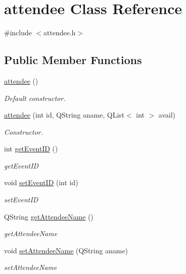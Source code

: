 \hypertarget{classattendee}{}\section{attendee Class Reference}
\label{classattendee}


{\ttfamily \#include $<$attendee.\+h$>$}

\subsection*{Public Member Functions}
\begin{DoxyCompactItemize}
\item 
\hyperlink{classattendee_a9a40f413382f38d884f549e839d597be}{attendee} ()
\begin{DoxyCompactList}\small\item\em Default constructor. \end{DoxyCompactList}\item 
\hyperlink{classattendee_a18ac0517146b42c12028c2cc7d056ca3}{attendee} (int id, Q\+String aname, Q\+List$<$ int $>$ avail)
\begin{DoxyCompactList}\small\item\em Constructor. \end{DoxyCompactList}\item 
int \hyperlink{classattendee_a401329192a983fa7ce39a23864082d9c}{get\+Event\+ID} ()
\begin{DoxyCompactList}\small\item\em get\+Event\+ID \end{DoxyCompactList}\item 
void \hyperlink{classattendee_a9342533ee9136a1714329114b2a9c114}{set\+Event\+ID} (int id)
\begin{DoxyCompactList}\small\item\em set\+Event\+ID \end{DoxyCompactList}\item 
Q\+String \hyperlink{classattendee_a7af6210007dc95cb254562f5e3ed695b}{get\+Attendee\+Name} ()
\begin{DoxyCompactList}\small\item\em get\+Attendee\+Name \end{DoxyCompactList}\item 
void \hyperlink{classattendee_a1474b7029b761e5c0bdd418d6b985ff9}{set\+Attendee\+Name} (Q\+String aname)
\begin{DoxyCompactList}\small\item\em set\+Attendee\+Name \end{DoxyCompactList}\item 

\end{DoxyCompactItemize}
